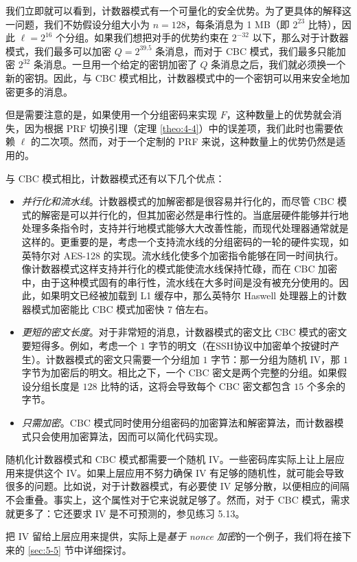 我们立即就可以看到，计数器模式有一个可量化的安全优势。为了更具体的解释这一问题，我们不妨假设分组大小为 $n=128$，每条消息为 1 MB（即 $2^{23}$ 比特），因此 $\ell=2^{16}$ 个分组。如果我们想把对手的优势约束在 $2^{-32}$ 以下，那么对于计数器模式，我们最多可以加密 $Q=2^{39.5}$ 条消息，而对于 CBC 模式，我们最多只能加密 $2^{32}$ 条消息。一旦用一个给定的密钥加密了 $Q$ 条消息之后，我们就必须换一个新的密钥。因此，与 CBC 模式相比，计数器模式中的一个密钥可以用来安全地加密更多的消息。

但是需要注意的是，如果使用一个分组密码来实现 $F$，这种数量上的优势就会消失，因为根据 PRF 切换引理（定理 \ref{theo:4-4}）中的误差项，我们此时也需要依赖 $\ell$ 的二次项。然而，对于一个定制的 PRF 来说，这种数量上的优势仍然是适用的。

与 CBC 模式相比，计数器模式还有以下几个优点：
\begin{itemize}
	\item \emph{并行化和流水线}。计数器模式的加解密都是很容易并行化的，而尽管 CBC 模式的解密是可以并行化的，但其加密必然是串行性的。当底层硬件能够并行地处理多条指令时，支持并行地模式能够大大改善性能，而现代处理器通常就是这样的。更重要的是，考虑一个支持流水线的分组密码的一轮的硬件实现，如英特尔对 AES-128 的实现。流水线化使多个加密指令能够在同一时间执行。像计数器模式这样支持并行化的模式能使流水线保持忙碌，而在 CBC 加密中，由于这种模式固有的串行性，流水线在大多时间是没有被充分使用的。因此，如果明文已经被加载到 L1 缓存中，那么英特尔 Haswell 处理器上的计数器模式加密能比 CBC 模式加密快 $7$ 倍左右。
	\item \emph{更短的密文长度}。对于非常短的消息，计数器模式的密文比 CBC 模式的密文要短得多。例如，考虑一个 $1$ 字节的明文（在SSH协议中加密单个按键时产生）。计数器模式的密文只需要一个分组加 $1$ 字节：那一分组为随机 IV，那 $1$ 字节为加密后的明文。相比之下，一个 CBC 密文是两个完整的分组。如果假设分组长度是 $128$ 比特的话，这将会导致每个 CBC 密文都包含 $15$ 个多余的字节。
	\item \emph{只需加密}。CBC 模式同时使用分组密码的加密算法和解密算法，而计数器模式只会使用加密算法，因而可以简化代码实现。
\end{itemize}

\begin{remark}\label{remark:5-4}
随机化计数器模式和 CBC 模式都需要一个随机 IV。一些密码库实际上让上层应用来提供这个 IV。如果上层应用不努力确保 IV 有足够的随机性，就可能会导致很多的问题。比如说，对于计数器模式，有必要使 IV 足够分散，以便相应的间隔不会重叠。事实上，这个属性对于它来说就足够了。然而，对于 CBC 模式，需求就更多了：它还要求 IV 是不可预测的，参见练习 5.13。

把 IV 留给上层应用来提供，实际上是\emph{基于 nonce 加密}的一个例子，我们将在接下来的 \ref{sec:5-5} 节中详细探讨。
\end{remark}